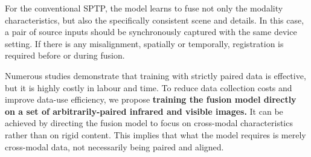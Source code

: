\label{sec:assumption}
For the conventional SPTP, the model learns to fuse not only the modality characteristics, but also the specifically consistent scene and details. 
In this case, a pair of source inputs should be synchronously captured with the same device setting. 
If there is any misalignment, spatially or temporally, registration is required before or during fusion.


Numerous studies demonstrate that training with strictly paired data is effective, but it is highly costly in labour and time.  
To reduce data collection costs and improve data-use efficiency, we propose
\textbf{ training the fusion model directly on a set of arbitrarily-paired infrared and visible images. }
It can be achieved by directing the fusion model to focus on cross-modal characteristics rather than on rigid content. 
This implies that what the model requires is merely cross-modal data, not necessarily being paired and aligned.  

% 

